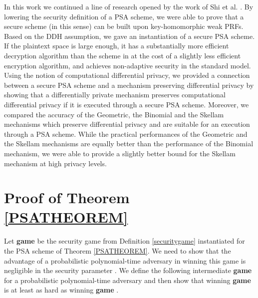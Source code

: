 \documentclass[10pt]{extarticle}
\begin{document}
In this work we continued a line of research opened by the work of Shi et al. \cite{2}. By lowering the security definition of a PSA scheme, we were able to prove that a secure scheme (in this sense) can be built upon key-homomorphic weak PRFs. Based on the DDH assumption, we gave an instantiation of a secure PSA scheme. If the plaintext space is large enough, it has a substantially more efficient decryption algorithm than the scheme in \cite{2} at the cost of a slightly less efficient encryption algorithm, and achieves non-adaptive security in the standard model. Using the notion of computational differential privacy, we provided a connection between a secure PSA scheme and a mechanism preserving differential privacy by showing that a differentially private mechanism preserves computational differential privacy if it is executed through a secure PSA scheme. Moreover, we compared the accuracy of the Geometric, the Binomial and the Skellam mechanisms which preserve differential privacy and are suitable for an execution through a PSA scheme. While the practical performances of the Geometric and the Skellam mechanisms are equally better than the performance of the Binomial mechanism, we were able to provide a slightly better bound for the Skellam mechanism at high privacy levels.


\appendix








\section{Proof of Theorem \ref{PSATHEOREM}}\label{ptproof}

Let \textbf{game}  be the security game from Definition \ref{securitygame} instantiated for the PSA scheme of Theorem \ref{PSATHEOREM}. We need to show that the advantage  of a probabilistic polynomial-time adversary  in winning this game is negligible in the security parameter . We define the following intermediate \textbf{game}  for a probabilistic polynomial-time adversary  and then show that winning \textbf{game}  is at least as hard as winning \textbf{game} .\\
\end{document}
